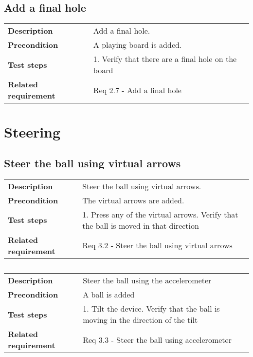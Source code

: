\documentclass[a4paper,titlepage]{article}
\begin{document}
\subsection{Add a final hole}
\begin{tabularx}{\textwidth}{lX}
	\textbf{Description}	&
		Add a final hole.\\
	\textbf{Precondition}	&
		A playing board is added.\\
	\textbf{Test steps}	&
		1. Verify that there are a final hole on the board\\
	\textbf{Related requirement}	&
		Req 2.7 - Add a final hole\\
\end{tabularx}


\newpage
\section{Steering}
\subsection{Steer the ball using virtual arrows}
\begin{tabularx}{\textwidth}{lX}
	\textbf{Description}	&
		Steer the ball using virtual arrows.\\
	\textbf{Precondition}	&
		The virtual arrows are added.\\
	\textbf{Test steps}	&
		1. Press any of the virtual arrows\newline
		2. Verify that the ball is moved in that direction\\
	\textbf{Related requirement}	&
		Req 3.2 - Steer the ball using virtual arrows \\
\end{tabularx}

\subsection{}
\begin{tabularx}{\textwidth}{lX}
	\textbf{Description}	&
		Steer the ball using the accelerometer\\
	\textbf{Precondition}	&
		A ball is added\\
	\textbf{Test steps}	&
		1. Tilt the device\newline
		2. Verify that the ball is moving in the direction of the tilt\\
	\textbf{Related requirement}	&
		Req 3.3 - Steer the ball using accelerometer\\
\end{tabularx}
\end{document}
